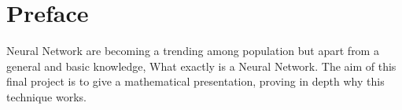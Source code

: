 \documentclass{book}
\begin{document}
    
\section{Preface}

Neural Network are becoming a trending among population but apart from a general and basic knowledge, What exactly is a 
Neural Network. The aim of this final project is to give a mathematical presentation, proving in depth why this 
technique works.    
\end{document}
